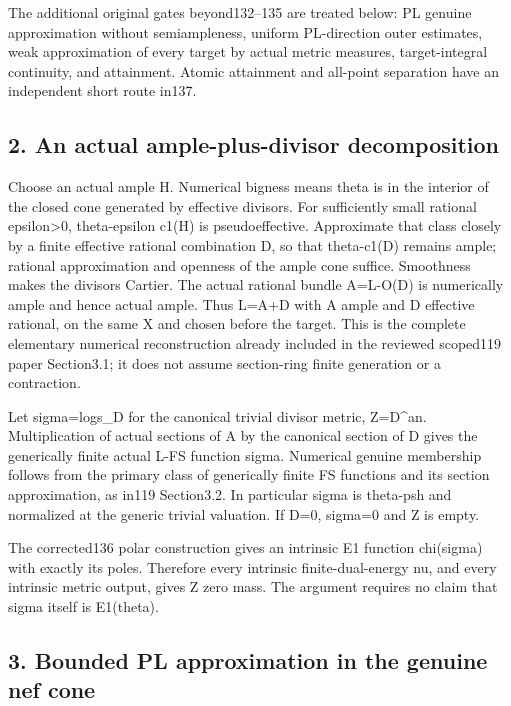 \documentclass[
  10pt,
]{article}
\begin{document}
The additional original gates beyond132--135 are treated below: PL
genuine approximation without semiampleness, uniform PL-direction outer
estimates, weak approximation of every target by actual metric measures,
target-integral continuity, and attainment. Atomic attainment and
all-point separation have an independent short route in137.

\subsection{2. An actual ample-plus-divisor
decomposition}\label{an-actual-ample-plus-divisor-decomposition}

Choose an actual ample H. Numerical bigness means theta is in the
interior of the closed cone generated by effective divisors. For
sufficiently small rational epsilon\textgreater0, theta-epsilon c1(H) is
pseudoeffective. Approximate that class closely by a finite effective
rational combination D, so that theta-c1(D) remains ample; rational
approximation and openness of the ample cone suffice. Smoothness makes
the divisors Cartier. The actual rational bundle A=L-O(D) is numerically
ample and hence actual ample. Thus L=A+D with A ample and D effective
rational, on the same X and chosen before the target. This is the
complete elementary numerical reconstruction already included in the
reviewed scoped119 paper Section3.1; it does not assume section-ring
finite generation or a contraction.

Let sigma=log\textbar\textbar s\_D\textbar\textbar{} for the canonical
trivial divisor metric, Z=\textbar D\textbar\^{}an. Multiplication of
actual sections of A by the canonical section of D gives the generically
finite actual L-FS function sigma. Numerical genuine membership follows
from the primary class of generically finite FS functions and its
section approximation, as in119 Section3.2. In particular sigma is
theta-psh and normalized at the generic trivial valuation. If D=0,
sigma=0 and Z is empty.

The corrected136 polar construction gives an intrinsic E1 function
chi(sigma) with exactly its poles. Therefore every intrinsic
finite-dual-energy nu, and every intrinsic metric output, gives Z zero
mass. The argument requires no claim that sigma itself is E1(theta).

\subsection{3. Bounded PL approximation in the genuine nef
cone}\label{bounded-pl-approximation-in-the-genuine-nef-cone}
\end{document}
